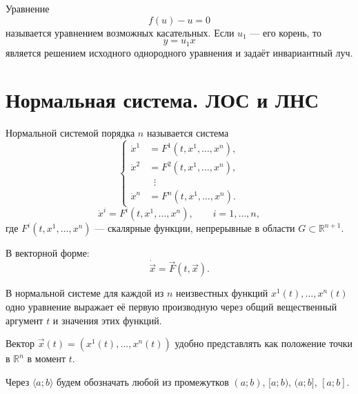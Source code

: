 \documentclass[12pt,a4paper]{article}
\numberwithin{equation}{section}
\newcommand{\R}{\mathbb{R}}
\newcommand{\vect}[1]{\vec{#1}}
\begin{document}
\begin{definitionHSE}
Уравнение
\[
f(u)-u=0
\]
называется уравнением возможных касательных. Если $u_1$ --- его корень, то
\[
y=u_1x
\]
является решением исходного однородного уравнения и задаёт инвариантный луч.
\end{definitionHSE}

\section[Нормальная система ОДУ]{Нормальная система. ЛОС и ЛНС}

\begin{definitionHSE}
Нормальной системой порядка $n$ называется система
\[
\left\{
\begin{aligned}
\dot{x}^1 &= F^1(t, x^1, \dots, x^n),\\[3pt]
\dot{x}^2 &= F^2(t, x^1, \dots, x^n),\\[3pt]
&\;\;\vdots\\
\dot{x}^n &= F^n(t, x^1, \dots, x^n).
\end{aligned}
\right.
\]
\begin{equation}
\dot{x}^i=F^i(t,x^1,\ldots,x^n),\qquad i=1,\ldots,n,
\label{eq:normal-system}
\end{equation}
где \(F^i(t,x^1,\ldots,x^n)\) --- скалярные функции, непрерывные в области \(G\subset\R^{n+1}\).

В векторной форме:
\[
\dot{\vect{x}}=\vect{F}(t,\vect{x}).
\]
\end{definitionHSE}

В нормальной системе для каждой из \(n\) неизвестных функций
\(x^1(t),\ldots,x^n(t)\) одно уравнение выражает её первую производную
через общий вещественный аргумент \(t\) и значения этих функций.

Вектор \(\vect{x}(t) = (x^1(t),\ldots,x^n(t))\) удобно представлять как положение точки в \(\mathbb{R}^n\) в момент \(t\).

\begin{remarkHSE}
Через $\langle a; b\rangle$ будем обозначать любой из промежутков
$(a; b)$, $[a; b)$, $(a; b]$, $[a; b]$.
\end{remarkHSE}
\end{document}
